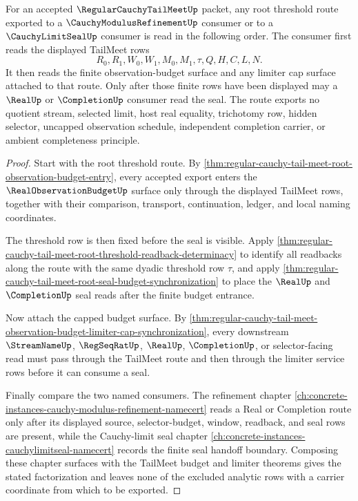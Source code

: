 \begin{theorem}
\label{thm:regular-cauchy-tail-meet-budgeted-refinement-seal-factorization}
For an accepted $\RegularCauchyTailMeetUp$ packet, any root threshold route exported to a $\CauchyModulusRefinementUp$ consumer or to a $\CauchyLimitSealUp$ consumer is read in the following order. The consumer first reads the displayed TailMeet rows
$$
R_0,R_1,W_0,W_1,M_0,M_1,\tau,Q,H,C,L,N.
$$
It then reads the finite observation-budget surface and any limiter cap surface attached to that route. Only after those finite rows have been displayed may a $\RealUp$ or $\CompletionUp$ consumer read the seal. The route exports no quotient stream, selected limit, host real equality, trichotomy row, hidden selector, uncapped observation schedule, independent completion carrier, or ambient completeness principle.
\end{theorem}
\begin{proof}
Start with the root threshold route. By \autoref{thm:regular-cauchy-tail-meet-root-observation-budget-entry}, every accepted export enters the $\RealObservationBudgetUp$ surface only through the displayed TailMeet rows, together with their comparison, transport, continuation, ledger, and local naming coordinates.

The threshold row is then fixed before the seal is visible. Apply \autoref{thm:regular-cauchy-tail-meet-root-threshold-readback-determinacy} to identify all readbacks along the route with the same dyadic threshold row $\tau$, and apply \autoref{thm:regular-cauchy-tail-meet-root-seal-budget-synchronization} to place the $\RealUp$ and $\CompletionUp$ seal reads after the finite budget entrance.

Now attach the capped budget surface. By \autoref{thm:regular-cauchy-tail-meet-observation-budget-limiter-cap-synchronization}, every downstream $\StreamNameUp$, $\RegSeqRatUp$, $\RealUp$, $\CompletionUp$, or selector-facing read must pass through the TailMeet route and then through the limiter service rows before it can consume a seal.

Finally compare the two named consumers. The refinement chapter \autoref{ch:concrete-instances-cauchy-modulus-refinement-namecert} reads a Real or Completion route only after its displayed source, selector-budget, window, readback, and seal rows are present, while the Cauchy-limit seal chapter \autoref{ch:concrete-instances-cauchylimitseal-namecert} records the finite seal handoff boundary. Composing these chapter surfaces with the TailMeet budget and limiter theorems gives the stated factorization and leaves none of the excluded analytic rows with a carrier coordinate from which to be exported.
\end{proof}

